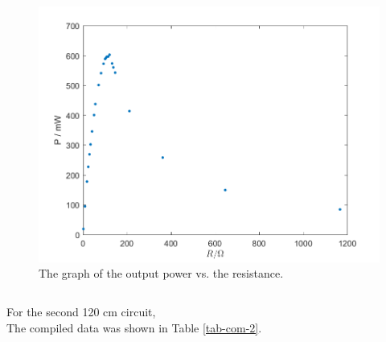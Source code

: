 \begin{figure}[H]
\centering
\includegraphics[scale=0.6]{PR1.png}
\caption{The graph of the output power vs. the resistance.}
\label{PR-1}
\end{figure}
$$$$

For the second 120 cm circuit,\\

The compiled data was shown in Table \ref{tab-com-2}.\\

